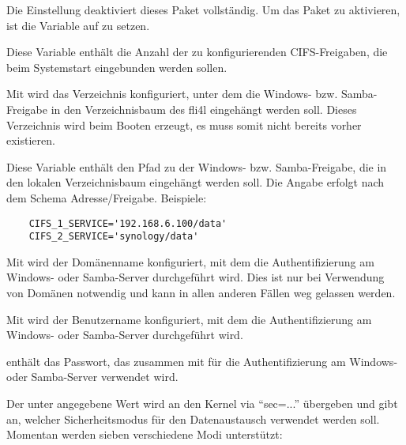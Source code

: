 \begin{description}

  Die Einstellung  deaktiviert dieses Paket vollständig.
  Um das Paket zu aktivieren, ist die Variable  auf 
   zu setzen.

  Diese Variable enthält die Anzahl der zu konfigurierenden CIFS-Freigaben, die
  beim Systemstart eingebunden werden sollen.

  Mit  wird das Verzeichnis konfiguriert, unter
  dem die Windows- bzw. Samba-Freigabe in den Verzeichnisbaum des fli4l
  eingehängt werden soll. Dieses Verzeichnis wird beim Booten erzeugt, es muss
  somit nicht bereits vorher existieren.

  Diese Variable enthält den Pfad zu der Windows- bzw. Samba-Freigabe, die in
  den lokalen Verzeichnisbaum eingehängt werden soll. Die Angabe erfolgt nach
  dem Schema Adresse/Freigabe. Beispiele:
  \begin{example}
  \begin{verbatim}
    CIFS_1_SERVICE='192.168.6.100/data'
    CIFS_2_SERVICE='synology/data'
  \end{verbatim}
  \end{example}

  Mit  wird der Domänenname konfiguriert, mit dem die
  Authentifizierung am Windows- oder Samba-Server durchgeführt wird. Dies ist
  nur bei Verwendung von Domänen notwendig und kann in allen anderen Fällen weg
  gelassen werden.

  Mit  wird der Benutzername konfiguriert, mit dem die
  Authentifizierung am Windows- oder Samba-Server durchgeführt wird.

   enthält das Passwort, das zusammen mit
   für die Authentifizierung am Windows- oder
  Samba-Server verwendet wird.

  Der unter  angegebene Wert wird an den Kernel
  via ``sec=...'' übergeben und gibt an, welcher Sicherheitsmodus für den
  Datenaustausch verwendet werden soll. Momentan werden sieben verschiedene
  Modi unterstützt:


\end{description}

